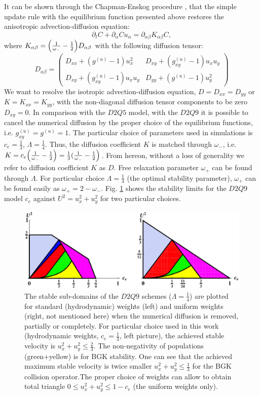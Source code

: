 \documentclass{article}
\newcommand{\beq}{\begin{equation}}
\newcommand{\feq}{\end{equation}}
\newcommand{\omegaplus}{\omega_{+}}
\newcommand{\omegaminus}{\omega_{-}}
\begin{document}
It can be shown through the Chapman-Enskog procedure \cite{chapman}, that the simple update rule
with the equilibrium function presented above restores the anisotropic
advection-diffusion equation:
\beq
\partial_t C+ \partial_{\alpha} C u_{\alpha}=\partial_{\alpha\beta} K_{\alpha\beta} C,
\feq
where $K_{\alpha\beta}=\Bigl(\frac{1}{\omegaminus}-\frac{1}{2}\Bigr)D_{\alpha\beta}$
with the
following diffusion tensor:
\begin{equation}
D_{\alpha\beta}=
\begin{pmatrix}
D_{xx} + (g^{(u)}-1) u_x^2 & D_{xy}+(g_{xy}^{(u)}-1)u_x u_y\\
D_{xy} + (g_{xy}^{(u)}-1) u_x u_y& D_{yy}+(g^{(u)}-1) u_y^2 
\end{pmatrix}
\end{equation}
We want to resolve the isotropic advection-diffusion equation, $D=D_{xx}=D_{yy}$ or $K=K_{xx}=K_{yy}$, with the non-diagonal diffusion tensor components to be zero $D_{xy}=0$. In comparison with the $D2Q5$ model, with the $D2Q9$ it is
possible to cancel the numerical diffusion by the proper choice
of the equilibrium functions, i.e. $g_{xy}^{(u)}=g^{(u)}=1$.  The particular choice of parameters
used in simulations is $c_e=\frac{1}{3}$, $\Lambda=\frac{1}{4}$. Thus, the diffusion coefficient $K$
is matched through $\omegaminus$, i.e. $K=c_e
\Bigl(\frac{1}{\omegaminus}-\frac{1}{2}\Bigr)=\frac{1}{3}(\frac{1}{\omegaminus}-\frac{1}{2}\Bigr)$.
From hereon, without a loss of generality we refer to diffusion coefficient 
$K$ as $D$.  Free relaxation parameter $\omegaplus$ can be found through $\Lambda$. For particular
choice $\Lambda=\frac{1}{4}$ (the optimal stability parameter), $\omegaplus$ can be found easily as
$\omegaplus=2-\omegaminus$.  Fig. \ref{stability:d2q9} shows the stability limits for the $D2Q9$
model $c_e$ against $U^2=u_x^2+u_y^2$ for two particular choices.
\begin{figure}[htb!]
\includegraphics[width=\textwidth]{Figures/d2q9_stability.eps}
\caption{The stable sub-domains of the $D2Q9$ schemes ($\Lambda=\frac{1}{4}$)
are plotted for standard (hydrodynamic) weights (left) and uniform weights (right, not mentioned here) when the
numerical diffusion is removed, partially or completely. For particular choice used in this work (hydrodynamic weights, $c_e=\frac{1}{3}$, left picture), the achieved stable velocity is $u_x^2+u_y^2\leq\frac{2}{3}$. The non-negativity of populations (green+yellow) is for BGK stability. One can see that the achieved maximum stable velocity is twice smaller $u_x^2+u_y^2\leq \frac{1}{3}$ for the BGK collision operator.The proper choice of weights can
allow to obtain  total triangle $0 \leq u_x^2+u_y^2 \leq 1- c_e$ (the
uniform weights only).
\label{stability:d2q9}}
\end{figure}
\end{document}
